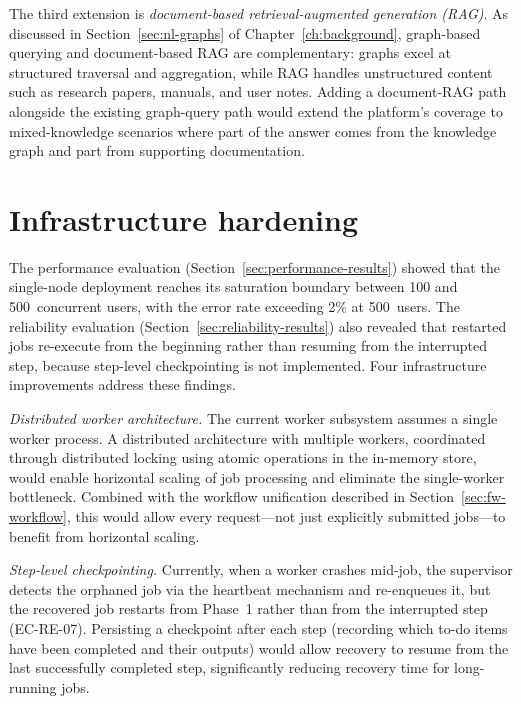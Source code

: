 \documentclass[a4paper]{sapthesis}
\begin{document}
The third extension is \emph{document-based retrieval-augmented
generation (RAG)}.  As discussed in Section~\ref{sec:nl-graphs} of
Chapter~\ref{ch:background}, graph-based querying and document-based RAG
are complementary: graphs excel at structured traversal and aggregation,
while RAG handles unstructured content such as research papers, manuals,
and user notes.  Adding a document-RAG path alongside the existing
graph-query path would extend the platform's coverage to
mixed-knowledge scenarios where part of the answer comes from the
knowledge graph and part from supporting documentation.

\section{Infrastructure hardening}
\label{sec:fw-infra}

The performance evaluation (Section~\ref{sec:performance-results})
showed that the single-node deployment reaches its saturation boundary
between 100 and 500~concurrent users, with the error rate exceeding
2\% at 500~users.  The reliability evaluation
(Section~\ref{sec:reliability-results}) also revealed that restarted jobs
re-execute from the beginning rather than resuming from the interrupted
step, because step-level checkpointing is not implemented.  Four
infrastructure improvements address these findings.

\emph{Distributed worker architecture.}  The current worker subsystem
assumes a single worker process.  A distributed architecture with multiple
workers, coordinated through distributed locking using atomic
operations in the in-memory store, would enable horizontal scaling of
job processing and eliminate the single-worker bottleneck.  Combined with the workflow unification described in
Section~\ref{sec:fw-workflow}, this would allow every request---not just
explicitly submitted jobs---to benefit from horizontal scaling.

\emph{Step-level checkpointing.}  Currently, when a worker crashes
mid-job, the supervisor detects the orphaned job via the heartbeat
mechanism and re-enqueues it, but the recovered job restarts from
Phase~1 rather than from the interrupted step (EC-RE-07).  Persisting
a checkpoint after each step (recording which to-do items have been
completed and their outputs) would allow recovery to resume from the
last successfully completed step, significantly reducing recovery time
for long-running jobs.
\end{document}
